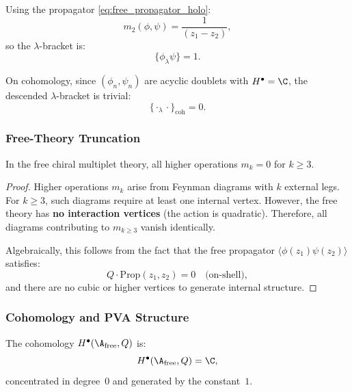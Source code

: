 Using the propagator \eqref{eq:free_propagator_holo}:
\begin{equation}
m_2(\phi, \psi) = \frac{1}{(z_1 - z_2)},
\end{equation}
so the $\lambda$-bracket is:
\begin{equation}
\{\phi_\lambda \psi\} = 1.
\end{equation}

On cohomology, since $(\phi_n, \psi_n)$ are acyclic doublets with $H^\bullet = \C$, the descended $\lambda$-bracket is trivial:
\begin{equation}
\{\cdot_\lambda \cdot\}_{\text{coh}} = 0.
\end{equation}

\subsubsection{Free-Theory Truncation}

\begin{proposition}[All $m_{k \geq 3} = 0$ for Free Theory]
In the free chiral multiplet theory, all higher operations $m_k = 0$ for $k \geq 3$.
\end{proposition}

\begin{proof}
Higher operations $m_k$ arise from Feynman diagrams with $k$ external legs. For $k \geq 3$, such diagrams require at least one internal vertex. However, the free theory has \textbf{no interaction vertices} (the action is quadratic). Therefore, all diagrams contributing to $m_{k \geq 3}$ vanish identically.

Algebraically, this follows from the fact that the free propagator $\langle \phi(z_1)\psi(z_2)\rangle$ satisfies:
\begin{equation}
Q \cdot \text{Prop}(z_1, z_2) = 0 \quad \text{(on-shell)},
\end{equation}
and there are no cubic or higher vertices to generate internal structure.
\end{proof}

\subsubsection{Cohomology and PVA Structure}

\begin{proposition}
The cohomology $H^\bullet(\A_{\text{free}}, Q)$ is:
\begin{equation}
H^\bullet(\A_{\text{free}}, Q) = \C,
\end{equation}
concentrated in degree~$0$ and generated by the constant~$1$.
\end{proposition}

